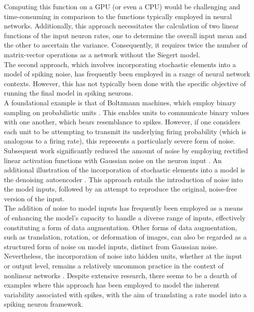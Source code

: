 \noindent Computing this function on a GPU (or even a CPU) would be challenging and time-consuming in comparison to the functions typically employed in neural networks. Additionally, this approach necessitates the calculation of two linear functions of the input neuron rates, one to determine the overall input mean and the other to ascertain the variance. Consequently, it requires twice the number of matrix-vector operations as a network without the Siegert model. \\

\noindent The second approach, which involves incorporating stochastic elements into a model of spiking noise, has frequently been employed in a range of neural network contexts. However, this has not typically been done with the specific objective of running the final model in spiking neurons. \\

\noindent A foundational example is that of Boltzmann machines, which employ binary sampling on probabilistic units \cite{hinton1983optimal}. This enables units to communicate binary values with one another, which bears resemblance to spikes. However, if one considers each unit to be attempting to transmit its underlying firing probability (which is analogous to a firing rate), this represents a particularly severe form of noise. \\

\noindent Subsequent work significantly reduced the amount of noise by employing rectified linear activation functions with Gaussian noise on the neuron input \cite{nair2010rectified}. An additional illustration of the incorporation of stochastic elements into a model is the denoising autoencoder \cite{vincent2008extracting}. This approach entails the introduction of noise into the model inputs, followed by an attempt to reproduce the original, noise-free version of the input. \\

\noindent The addition of noise to model inputs has frequently been employed as a means of enhancing the model's capacity to handle a diverse range of inputs, effectively constituting a form of data augmentation. Other forms of data augmentation, such as translation, rotation, or deformation of images, can also be regarded as a structured form of noise on model inputs, distinct from Gaussian noise. \\

\noindent Nevertheless, the incorporation of noise into hidden units, whether at the input or output level, remains a relatively uncommon practice in the context of nonlinear networks \cite{poole2014analyzing}. Despite extensive research, there seems to be a dearth of examples where this approach has been employed to model the inherent variability associated with spikes, with the aim of translating a rate model into a spiking neuron framework.

